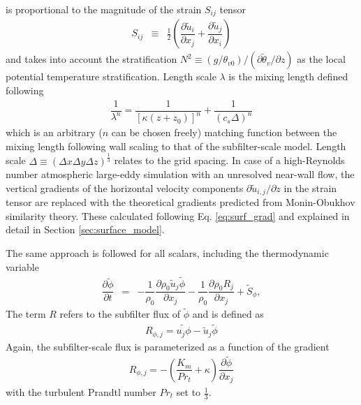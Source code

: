 \documentclass[gmd]{copernicus}
\newcommand{\uf}{\ensuremath{\widetilde{u}}}
\newcommand{\thetaf}{\ensuremath{\widetilde{\theta}}}
\newcommand{\phif}{\ensuremath{\widetilde{\phi}}}
\begin{document}
is proportional to the magnitude of the strain $S_{ij}$ tensor
\begin{eqnarray}
S_{ij} & \equiv & \frac{1}{2} \left( \dfrac{\partial \uf_i}{\partial x_j} + \dfrac{\partial \uf_j}{\partial x_i} \right)
\end{eqnarray}
 and takes into account the stratification $N^2 \equiv (g/\theta_{v0})/(\partial \thetaf_v / \partial z)$ as the local potential temperature stratification. Length scale  $\lambda$ is the mixing length defined following \citet{Mason1992}
\begin{eqnarray}
\dfrac{1}{\lambda^n} = \dfrac{1}{\left[ \kappa \left(z + z_0 \right) \right]^n} + \dfrac{1}{\left( c_s \Delta \right)^n}
\end{eqnarray}
which is an arbitrary ($n$ can be chosen freely) matching function between the mixing length following wall scaling to that of the subfilter-scale model. Length scale $\Delta \equiv (\Delta x \Delta y \Delta z)^\frac{1}{3}$ relates to the grid spacing. In case of a high-Reynolds number atmospheric large-eddy simulation with an unresolved near-wall flow, the vertical gradients of the horizontal velocity components $\partial \uf_{i,j}/\partial z$  in the strain tensor are replaced with the theoretical gradients predicted from Monin-Obukhov similarity theory. These calculated following Eq. \ref{eq:surf_grad} and explained in detail in Section \ref{sec:surface_model}.

The same approach is followed for all scalars, including the thermodynamic variable
\begin{eqnarray}
\dfrac{\partial \phif}{\partial t} & = & - \dfrac{1}{\rho_0} \dfrac{\partial \rho_0 \uf_j \phif}{\partial x_j} - \dfrac{1}{\rho_0} \dfrac{\partial \rho_0 R_j}{\partial x_j} + \widetilde{S}_\phi, \label{eq:consscal}
\end{eqnarray}
The term $R$ refers to the subfilter flux of $\phif$ and is defined as
\begin{eqnarray}
R_{\phi,j} = \widetilde{u_j \phi} - \uf_j \phif
\end{eqnarray}
Again, the subfilter-scale flux is parameterized as a function of the gradient
\begin{eqnarray}
R_{\phi,j} = - \left( \dfrac{K_m}{Pr_t} + \kappa \right) \dfrac{\partial \phif}{\partial x_j}
\end{eqnarray}
with the turbulent Prandtl number $Pr_t$ set to $\frac{1}{3}$.
\end{document}

